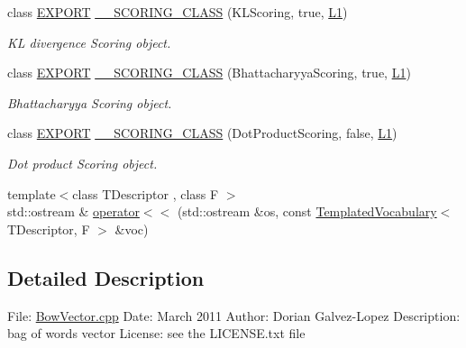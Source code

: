 \begin{DoxyCompactItemize}
class \mbox{\hyperlink{_d_bo_w2_2_d_utils_2config_8h_a3472d8cdbb788d5f1815b3522595bc49}{E\+X\+P\+O\+RT}} \mbox{\hyperlink{namespace_d_bo_w2_a9af1c21239089d77c337c65fac3e7bf5}{\+\_\+\+\_\+\+S\+C\+O\+R\+I\+N\+G\+\_\+\+C\+L\+A\+SS}} (K\+L\+Scoring, true, \mbox{\hyperlink{namespace_d_bo_w2_a53e9e0bcfc25c861815e413a7cf3fa51a94f5879ff083c0a8364805ae4f9c2d5c}{L1}})
\begin{DoxyCompactList}\small\item\em KL divergence Scoring object. \end{DoxyCompactList}\item 
class \mbox{\hyperlink{_d_bo_w2_2_d_utils_2config_8h_a3472d8cdbb788d5f1815b3522595bc49}{E\+X\+P\+O\+RT}} \mbox{\hyperlink{namespace_d_bo_w2_a7135fab6a887afb7d2b4e6254b4875ea}{\+\_\+\+\_\+\+S\+C\+O\+R\+I\+N\+G\+\_\+\+C\+L\+A\+SS}} (Bhattacharyya\+Scoring, true, \mbox{\hyperlink{namespace_d_bo_w2_a53e9e0bcfc25c861815e413a7cf3fa51a94f5879ff083c0a8364805ae4f9c2d5c}{L1}})
\begin{DoxyCompactList}\small\item\em Bhattacharyya Scoring object. \end{DoxyCompactList}\item 
class \mbox{\hyperlink{_d_bo_w2_2_d_utils_2config_8h_a3472d8cdbb788d5f1815b3522595bc49}{E\+X\+P\+O\+RT}} \mbox{\hyperlink{namespace_d_bo_w2_a8b3715c76bccab82aa18804b6b7dc1ba}{\+\_\+\+\_\+\+S\+C\+O\+R\+I\+N\+G\+\_\+\+C\+L\+A\+SS}} (Dot\+Product\+Scoring, false, \mbox{\hyperlink{namespace_d_bo_w2_a53e9e0bcfc25c861815e413a7cf3fa51a94f5879ff083c0a8364805ae4f9c2d5c}{L1}})
\begin{DoxyCompactList}\small\item\em Dot product Scoring object. \end{DoxyCompactList}\item 
{\footnotesize template$<$class T\+Descriptor , class F $>$ }\\std\+::ostream \& \mbox{\hyperlink{namespace_d_bo_w2_aecdf616fe16d2cf09f521a603b9d43f1}{operator$<$$<$}} (std\+::ostream \&os, const \mbox{\hyperlink{class_d_bo_w2_1_1_templated_vocabulary}{Templated\+Vocabulary}}$<$ T\+Descriptor, F $>$ \&voc)
\end{DoxyCompactItemize}


\subsection{Detailed Description}
File\+: \mbox{\hyperlink{_bow_vector_8cpp}{Bow\+Vector.\+cpp}} Date\+: March 2011 Author\+: Dorian Galvez-\/\+Lopez Description\+: bag of words vector License\+: see the L\+I\+C\+E\+N\+S\+E.\+txt file

